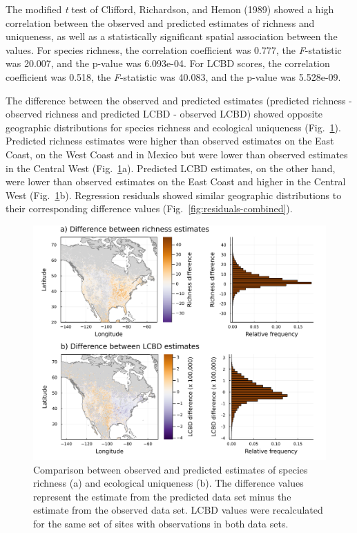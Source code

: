 \documentclass[11pt]{article}
\makeatletter
\def\maxwidth{\ifdim\Gin@nat@width>\linewidth\linewidth
\else\Gin@nat@width\fi}
\let\Oldincludegraphics\includegraphics
\renewcommand{\includegraphics}[1]{\Oldincludegraphics[width=\maxwidth]{#1}}
\makeatother
\begin{document}
The modified \emph{t} test of Clifford, Richardson, and Hemon (1989)
showed a high correlation between the observed and predicted estimates
of richness and uniqueness, as well as a statistically significant
spatial association between the values. For species richness, the
correlation coefficient was 0.777, the \emph{F}-statistic was 20.007,
and the p-value was 6.093e-04. For LCBD scores, the correlation
coefficient was 0.518, the \emph{F}-statistic was 40.083, and the
p-value was 5.528e-09.

The difference between the observed and predicted estimates (predicted
richness - observed richness and predicted LCBD - observed LCBD) showed
opposite geographic distributions for species richness and ecological
uniqueness (Fig.~\ref{fig:comparison-combined}). Predicted richness
estimates were higher than observed estimates on the East Coast, on the
West Coast and in Mexico but were lower than observed estimates in the
Central West (Fig.~\ref{fig:comparison-combined}a). Predicted LCBD
estimates, on the other hand, were lower than observed estimates on the
East Coast and higher in the Central West
(Fig.~\ref{fig:comparison-combined}b). Regression residuals showed
similar geographic distributions to their corresponding difference
values (Fig.~\ref{fig:residuals-combined}).

\begin{figure}
\hypertarget{fig:comparison-combined}{%
\centering
\includegraphics{figures/comparison-difference.png}
\caption{Comparison between observed and predicted estimates of species
richness (a) and ecological uniqueness (b). The difference values
represent the estimate from the predicted data set minus the estimate
from the observed data set. LCBD values were recalculated for the same
set of sites with observations in both data
sets.}\label{fig:comparison-combined}
}
\end{figure}
\end{document}
